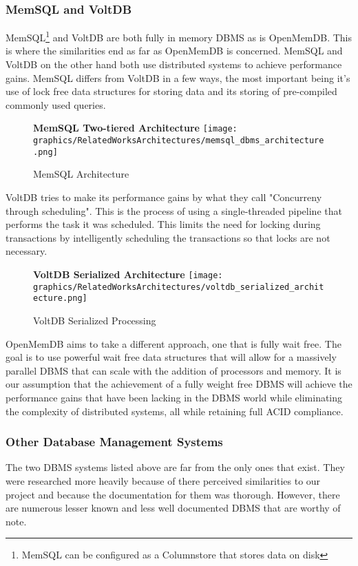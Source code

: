 \documentclass[letterpaper, 12pt]{article}
\begin{document}
	\subsubsection{MemSQL and VoltDB}
	MemSQL\footnote{MemSQL can be configured as a Columnstore that stores data on disk}
	and VoltDB are both fully in memory DBMS as is OpenMemDB. This is where the
	similarities end as far as OpenMemDB is concerned. MemSQL and VoltDB on the other 
	hand both use distributed systems to achieve performance gains. MemSQL differs from 
	VoltDB in a few ways, the most important being it's use of lock free data structures
	for storing data and its storing of pre-compiled commonly used queries\cite{MemSQL}.
	\begin{figure}
	  \centering
	  \textbf{MemSQL Two-tiered Architecture}
	  \texttt{[image: graphics/RelatedWorksArchitectures/memsql\_dbms\_architecture.png]}
	  \caption{MemSQL Architecture}
	\end{figure}
	VoltDB tries to make its performance gains by what they call "Concurreny through
	scheduling"\cite{VoltDB}. This is the process of using a single-threaded pipeline 
	that performs the task it was scheduled. This limits the need for locking during
	transactions by intelligently scheduling the transactions so that locks are not
	necessary.
	\begin{figure}
	  \centering
	  \textbf{VoltDB Serialized Architecture}
	  \texttt{[image: graphics/RelatedWorksArchitectures/voltdb\_serialized\_architecture.png]}
	  \caption{VoltDB Serialized Processing}
	\end{figure}
	\par\vspace{\baselineskip}
	OpenMemDB aims to take a different approach, one that is fully wait free. The goal is 
	to use powerful wait free data structures that will allow for a massively parallel 
	DBMS that can scale with the addition of processors and memory. It is our assumption 
	that the achievement of a fully weight free DBMS will achieve the performance gains 
	that have been lacking in the DBMS world while eliminating the complexity of 
	distributed systems, all while retaining full ACID compliance.
	
	\subsubsection{Other Database Management Systems}
	The two DBMS systems listed above are far from the only ones that exist. They were
	researched more heavily because of there perceived similarities to our project and
	because the documentation for them was thorough. However, there are numerous lesser
	known and less well documented DBMS that are worthy of note.
\end{document}
